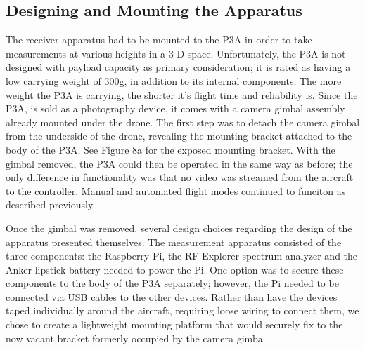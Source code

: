 \documentclass[pageno]{jpaper}
\begin{document}
\subsection{Designing and Mounting the Apparatus}
The receiver apparatus had to be mounted to the P3A in order to take measurements at various heights in a 3-D space. Unfortunately, the P3A is not designed with payload capacity as primary consideration; it is rated as having a low carrying weight of 300g\cite{dji}, in addition to its internal components. The more weight the P3A is carrying, the shorter it's flight time and reliability is. Since the P3A, is sold as a photography device, it comes with a camera gimbal assembly already mounted under the drone. The first step was to detach the camera gimbal from the underside of the drone, revealing the mounting bracket attached to the body of the P3A.  See Figure 8a for the exposed mounting bracket. With the gimbal removed, the P3A could then be operated in the same way as before; the only difference in functionality was that no video was streamed from the aircraft to the controller. Manual and automated flight modes continued to funciton as described previously. 

 Once the gimbal was removed, several design choices regarding the design of the apparatus presented themselves. The measurement apparatus consisted of the three components: the Raspberry Pi, the RF Explorer spectrum analyzer and the Anker lipstick battery needed to power the Pi. One option was to secure these components to the body of the P3A separately; however, the Pi needed to be connected via USB cables to the other devices. Rather than have the devices taped individually around the aircraft, requiring loose wiring to connect them, we chose to create a lightweight mounting platform that would securely fix to the now vacant bracket formerly occupied by the camera gimba.  
 
\end{document}
